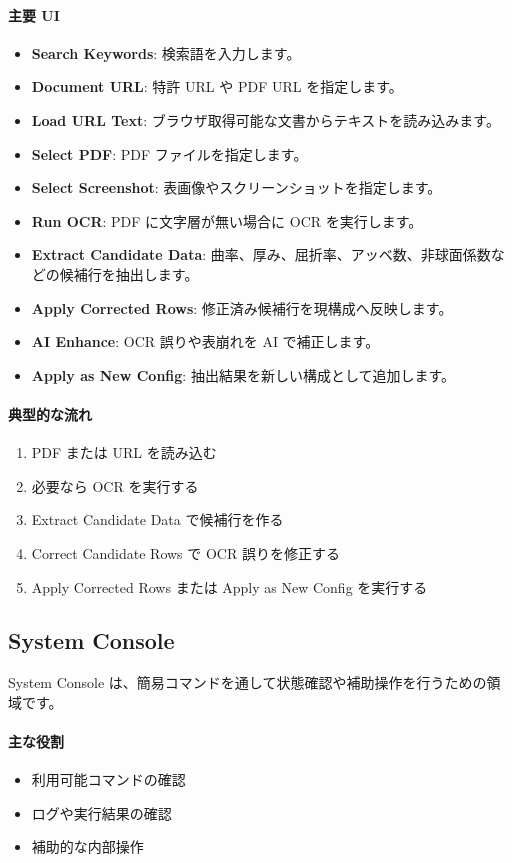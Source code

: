 \documentclass[11pt]{article}
\begin{document}
\paragraph{主要 UI}
\begin{itemize}
  \item \textbf{Search Keywords}: 検索語を入力します。
  \item \textbf{Document URL}: 特許 URL や PDF URL を指定します。
  \item \textbf{Load URL Text}: ブラウザ取得可能な文書からテキストを読み込みます。
  \item \textbf{Select PDF}: PDF ファイルを指定します。
  \item \textbf{Select Screenshot}: 表画像やスクリーンショットを指定します。
  \item \textbf{Run OCR}: PDF に文字層が無い場合に OCR を実行します。
  \item \textbf{Extract Candidate Data}: 曲率、厚み、屈折率、アッベ数、非球面係数などの候補行を抽出します。
  \item \textbf{Apply Corrected Rows}: 修正済み候補行を現構成へ反映します。
  \item \textbf{AI Enhance}: OCR 誤りや表崩れを AI で補正します。
  \item \textbf{Apply as New Config}: 抽出結果を新しい構成として追加します。
\end{itemize}

\paragraph{典型的な流れ}
\begin{enumerate}
  \item PDF または URL を読み込む
  \item 必要なら OCR を実行する
  \item Extract Candidate Data で候補行を作る
  \item Correct Candidate Rows で OCR 誤りを修正する
  \item Apply Corrected Rows または Apply as New Config を実行する
\end{enumerate}

\subsection{System Console}
System Console は、簡易コマンドを通して状態確認や補助操作を行うための領域です。

\paragraph{主な役割}
\begin{itemize}
  \item 利用可能コマンドの確認
  \item ログや実行結果の確認
  \item 補助的な内部操作
\end{itemize}
\end{document}
